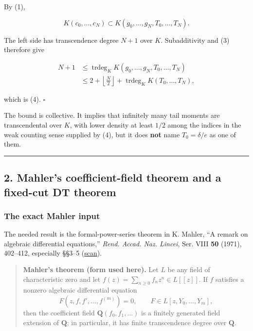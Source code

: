 \documentclass[11pt]{article}
\theoremstyle{keio}
\theoremstyle{definition}
\theoremstyle{remark}
\begin{document}
By (1),

\[
 K(c_0,\ldots,c_N)\subset
 K(g_0,\ldots,g_N,T_0,\ldots,T_N).
\]

The left side has transcendence degree \(N+1\) over \(K\). Subadditivity
and (3) therefore give

\[
\begin{aligned}
N+1
&\le \operatorname{trdeg}_K K(g_0,\ldots,g_N,T_0,\ldots,T_N)\\
&\le 2+\left\lfloor\frac N2\right\rfloor
 +\operatorname{trdeg}_K K(T_0,\ldots,T_N),
\end{aligned}
\]

which is (4). \(\square\)

The bound is collective. It implies that infinitely many tail moments are
transcendental over \(K\), with lower density at least \(1/2\) among the
indices in the weak counting sense supplied by (4), but it does \textbf{not} name
\(T_0=\delta/e\) as one of them.

\begin{center}\rule{0.5\linewidth}{0.5pt}\end{center}

\subsection{2. Mahler's coefficient-field theorem and a fixed-cut DT theorem}

\subsubsection{The exact Mahler input}

The needed result is the formal-power-series theorem in K. Mahler,
``A remark on algebraic differential equations,'' \emph{Rend. Accad. Naz. Lincei},
Ser. VIII \textbf{50} (1971), 402--412, especially §§3--5
(\href{https://carmamaths.org/resources/mahler/docs/176.pdf}{scan}).

\begin{quote}
\textbf{Mahler's theorem (form used here).} Let \(L\) be any field of
characteristic zero and let \(f(z)=\sum_{n\ge0}f_nz^n\in L[[z]]\). If
\(f\) satisfies a nonzero algebraic differential equation
\[
F(z,f,f',\ldots,f^{(m)})=0,
\qquad F\in L[z,Y_0,\ldots,Y_m],
\]
then the coefficient field \(\mathbf Q(f_0,f_1,\ldots)\) is a finitely
generated field extension of \(\mathbf Q\); in particular, it has finite
transcendence degree over \(\mathbf Q\).
\end{quote}
\end{document}
